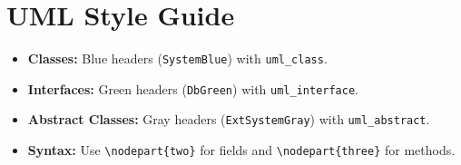 \documentclass{modern-uml}
\begin{document}
\begin{center}
\end{center}

\section{UML Style Guide}
\begin{itemize}
    \item \textbf{Classes:} Blue headers (\texttt{SystemBlue}) with \texttt{uml\_class}.
    \item \textbf{Interfaces:} Green headers (\texttt{DbGreen}) with \texttt{uml\_interface}.
    \item \textbf{Abstract Classes:} Gray headers (\texttt{ExtSystemGray}) with \texttt{uml\_abstract}.
    \item \textbf{Syntax:} Use \texttt{\textbackslash nodepart\{two\}} for fields and \texttt{\textbackslash nodepart\{three\}} for methods.
\end{itemize}
\end{document}
